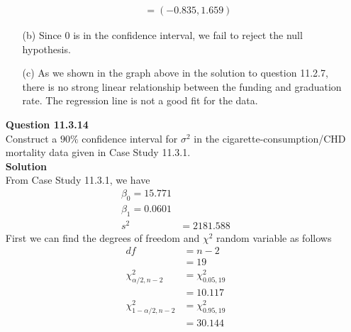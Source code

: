 \documentclass{uofa-eng-assignment}
\begin{document}
\begin{enumerate}
\begin{itemize}
\begin{align*}
                       & = (-0.835, 1.659)
                  \end{align*}
            \item [(b)] Since $0$ is in the confidence interval, we fail to reject the null hypothesis.
            \item [(c)] As we shown in the graph above in the solution to question 11.2.7, there is no strong linear relationship between
                  the funding and graduation rate. The regression line is not a good fit for the data.
        \end{itemize}
    \item[]
        \textbf{Question 11.3.14} \\
        Construct a $90\%$ confidence interval for $\sigma^2$ in the cigarette-consumption/CHD mortality data
        given in Case Study 11.3.1. \\
        \textbf{Solution} \\
        From Case Study 11.3.1, we have
        \begin{align*}
            \beta_0 = 15.771 \\
            \beta_1 = 0.0601 \\
            s^2 & = 2181.588
        \end{align*}
        First we can find the degrees of freedom and $\chi^2$ random variable as follows
        \begin{align*}
            df                       & = n - 2             \\
                                     & = 19                \\
            \chi^2_{\alpha/2, n-2}   & = \chi^2_{0.05, 19} \\
                                     & = 10.117            \\
            \chi^2_{1-\alpha/2, n-2} & = \chi^2_{0.95, 19} \\
                                     & = 30.144
        \end{align*}

\end{enumerate}
\end{document}
